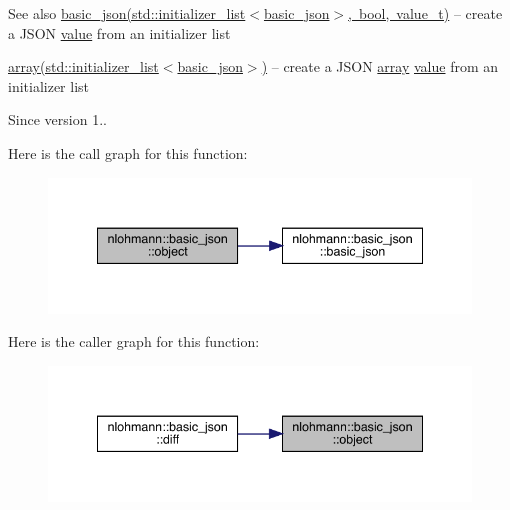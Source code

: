 \begin{DoxySeeAlso}{See also}
\mbox{\hyperlink{classnlohmann_1_1basic__json_afbad48316e7cd37366ba3ac5d7e5859e}{basic\+\_\+json(std\+::initializer\+\_\+list$<$basic\+\_\+json$>$, bool, value\+\_\+t)}} -- create a J\+S\+ON \mbox{\hyperlink{classnlohmann_1_1basic__json_af9c51328fbe1da75eca750be3009917a}{value}} from an initializer list 

\mbox{\hyperlink{classnlohmann_1_1basic__json_a4a4ec75e4d2845d9bcf7a9e5458e4949}{array(std\+::initializer\+\_\+list$<$basic\+\_\+json$>$)}} -- create a J\+S\+ON \mbox{\hyperlink{classnlohmann_1_1basic__json_a4a4ec75e4d2845d9bcf7a9e5458e4949}{array}} \mbox{\hyperlink{classnlohmann_1_1basic__json_af9c51328fbe1da75eca750be3009917a}{value}} from an initializer list
\end{DoxySeeAlso}
\begin{DoxySince}{Since}
version 1.. 
\end{DoxySince}
Here is the call graph for this function\+:\nopagebreak
\begin{figure}[H]
\begin{center}
\leavevmode
\includegraphics[width=341pt]{classnlohmann_1_1basic__json_a9f42ee7d10eee2d5a73fd94ca7f767ca_cgraph}
\end{center}
\end{figure}
Here is the caller graph for this function\+:\nopagebreak
\begin{figure}[H]
\begin{center}
\leavevmode
\includegraphics[width=341pt]{classnlohmann_1_1basic__json_a9f42ee7d10eee2d5a73fd94ca7f767ca_icgraph}
\end{center}
\end{figure}
\mbox{\label{classnlohmann_1_1basic__json_a26ef3058e249f82a04f8ec18f7419027}} 
